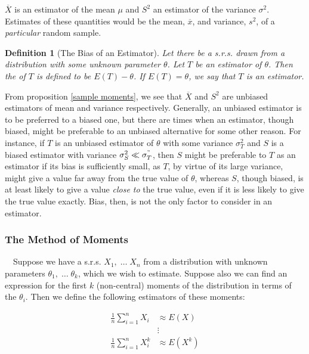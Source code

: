 \documentclass[12pt,a4paper]{article}
\newtheorem{defn}[thm]{Definition}
\newcommand{\uline}[1]{\underline{\smash{#1}}}
\begin{document}
$\overline{X}$ is an estimator of the mean $\mu$ and $S^2$ an estimator of the variance $\sigma^2$. Estimates of these quantities would be the mean, $\overline{x}$, and variance, $s^2$, of a \emph{particular} random sample.

\begin{defn}[The Bias of an Estimator]\vspace{1cm}

Let there be a s.r.s. drawn from a distribution with some unknown parameter $\theta$. Let $T$ be an estimator of $\theta$. Then the \uline{bias} of $T$ is defined to be $E(T) - \theta$. If $E(T) = \theta$, we say that $T$ is an \uline{unbiased} estimator.

\end{defn}

From proposition \ref{sample moments}, we see that $\overline{X}$ and $S^2$ are unbiased estimators of mean and variance respectively. Generally, an unbiased estimator is to be preferred to a biased one, but there are times when an estimator, though biased, might be preferable to an unbiased alternative for some other reason. For instance, if $T$ is an unbiased estimator of $\theta$ with some variance $\sigma_T^2$ and $S$ is a biased estimator with variance $\sigma_S^2\ll \sigma^"_T$, then $S$ might be preferable to $T$ as an estimator if its bias is sufficiently small, as $T$, by virtue of its large variance, might give a value far away from the true value of $\theta$, whereas $S$, though biased, is at least likely to give a value \emph{close to} the true value, even if it is less likely to give the true value exactly. Bias, then, is not the only factor to consider in an estimator.

\subsubsection{The Method of Moments}

$\quad$Suppose we have a s.r.s. $X_1,\;\hdots\; X_n$ from a distribution with unknown parameters $\theta_1,\;\hdots\; \theta_k$, which we wish to estimate. Suppose also we can find an expression for the first $k$ (non-central) moments of the distribution in terms of the $\theta_i$. Then we define the following estimators of these moments:

\begin{align*}
\frac{1}{n}\sum_{i=1}^n X_i &\approx E(X)\\
&\vdots\\
\frac{1}{n}\sum_{i=1}^n X_i^k &\approx E(X^k)
\end{align*}
\end{document}
